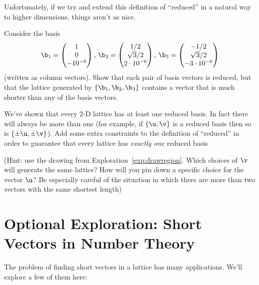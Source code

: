 \pagebreak
Unfortunately, if we try and extend this definition of ``reduced'' in a natural way to higher dimensions, things aren't as nice.

\begin{explor}\label{exp:3dbadbasis}
	Consider the basis
	\[\b_1=\begin{pmatrix}
	1\\0\\-10^{-6}
	\end{pmatrix},\,\b_2=\begin{pmatrix}
	1/2 \\ \sqrt{3}/2 \\ 2\cdot 10^{-6}
	\end{pmatrix},\,\b_3=\begin{pmatrix}
	-1/2 \\ \sqrt{3}/2 \\ -3\cdot 10^{-6}
	\end{pmatrix}\]
	(written as column vectors). Show that each pair of basis vectors is reduced, but that the lattice generated by $\{\b_1,\b_2,\b_3\}$ contains a vector that is much shorter than any of the basis vectors.
\end{explor}

\begin{explor}[(Optional)]
	We've shown that every $2$-D lattice has at least one reduced basis. In fact there will always be more than one (for example, if $\{\u,\v\}$ is a reduced basis then so is $\{\pm\u,\pm\v\}$).
	Add some extra constraints to the definition of ``reduced'' in order to guarantee that every lattice has \emph{exactly one} reduced basis \color{DarkGreen}
	
	(Hint: use the drawing from Exploration~\ref{exp:drawregion}. Which choices of $\v$ will generate the same lattice? How will you pin down a specific choice for the vector $\u$? Be especially careful of the situation in which there are more than two vectors with the same shortest length)
\end{explor}

\pagebreak

\section*{Optional Exploration: Short Vectors in Number Theory}

The problem of finding short vectors in a lattice has many applications. We'll explore a few of them here:

